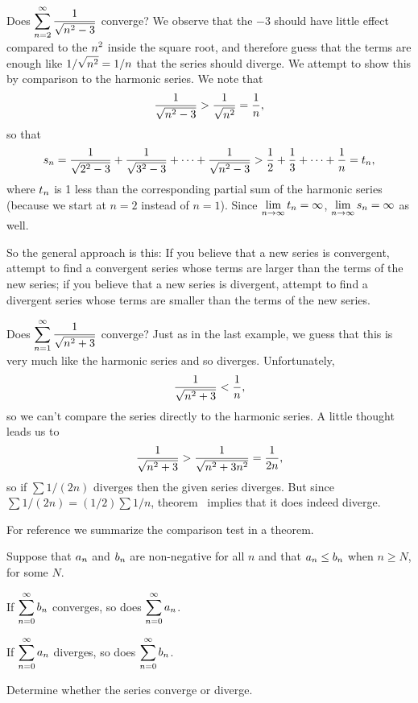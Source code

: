 \example Does $\displaystyle\sum_{n=2}^\infty {1\over\sqrt{n^2-3}}$ converge?
\ssk
We observe that the $-3$ should have little effect compared to the
$\displaystyle n^2$ inside the square root, and therefore guess that the terms are
enough like $\displaystyle 1/\sqrt{n^2}=1/n$ that the series should diverge. We
attempt to show this by comparison to the harmonic series. We note
that 
$${1\over\sqrt{n^2-3}} > {1\over\sqrt{n^2}} = {1\over n},$$
so that
$$
  s_n={1\over\sqrt{2^2-3}}+{1\over\sqrt{3^2-3}}+\cdots+
  {1\over\sqrt{n^2-3}} > {1\over 2} + {1\over3}+\cdots+{1\over n}=t_n,
$$
where $\displaystyle t_n$ is 1 less than the corresponding partial sum of the
harmonic series (because we start at $n=2$ instead of $n=1$). Since
$\displaystyle\lim_{n\to\infty}t_n=\infty$, $\displaystyle\lim_{n\to\infty}s_n=\infty$ as
well.
\endexample

So the general approach is this: If you believe that a new series is
convergent, attempt to find a convergent series whose terms are
larger than the terms of the new series; if you believe that a new
series is divergent, attempt to find a divergent series whose terms
are smaller than the terms of the new series.

\example Does $\displaystyle\sum_{n=1}^\infty {1\over\sqrt{n^2+3}}$ converge?
\ssk
Just as in the last example, we guess that this is very much like the
harmonic series and so diverges. Unfortunately,
$${1\over\sqrt{n^2+3}} < {1\over n},$$
so we can't compare the series directly to the harmonic series.
A little thought leads us to
$${1\over\sqrt{n^2+3}} > {1\over\sqrt{n^2+3n^2}} = {1\over2n},$$ so if
$\sum 1/(2n)$ diverges then the given series diverges. But since $\sum
1/(2n)=(1/2)\sum 1/n$, theorem~ implies
that it does indeed diverge.
\endexample

For reference we summarize the comparison test in a theorem.

\thm Suppose that $\displaystyle a_n$ and $\displaystyle b_n$ are non-negative for all $n$ and
that $\displaystyle a_n\le b_n$ when $n\ge N$, for some $N$.

\beginlist
\item{} If $\displaystyle\sum_{n=0}^\infty b_n$ converges, so does 
$\displaystyle\sum_{n=0}^\infty a_n$.
\item{} If $\displaystyle\sum_{n=0}^\infty a_n$ diverges, so does 
$\displaystyle\sum_{n=0}^\infty b_n$.

\endlist
\endproof

\exercises

Determine whether the series converge or diverge.

\twocol

